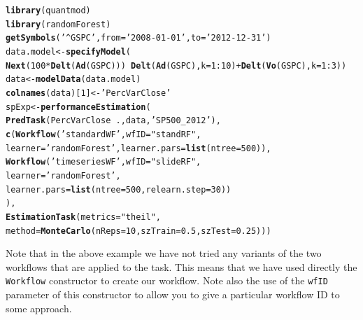 \documentclass[10pt,a4paper]{article}\usepackage[]{graphicx}\usepackage[]{color}
\makeatletter
\newcommand{\hlnum}[1]{\textcolor[rgb]{0.686,0.059,0.569}{#1}}%
\newcommand{\hlstr}[1]{\textcolor[rgb]{0.192,0.494,0.8}{#1}}%
\newcommand{\hlopt}[1]{\textcolor[rgb]{0,0,0}{#1}}%
\newcommand{\hlstd}[1]{\textcolor[rgb]{0.345,0.345,0.345}{#1}}%
\newcommand{\hlkwb}[1]{\textcolor[rgb]{0.69,0.353,0.396}{#1}}%
\newcommand{\hlkwc}[1]{\textcolor[rgb]{0.333,0.667,0.333}{#1}}%
\newcommand{\hlkwd}[1]{\textcolor[rgb]{0.737,0.353,0.396}{\textbf{#1}}}%
\newenvironment{kframe}{%
 \def\at@end@of@kframe{}%
 \ifinner\ifhmode%
  \def\at@end@of@kframe{\end{minipage}}%
  \begin{minipage}{\columnwidth}%
 \fi\fi%
 \def\FrameCommand##1{\hskip\@totalleftmargin \hskip-\fboxsep
 \colorbox{shadecolor}{##1}\hskip-\fboxsep
     \hskip-\linewidth \hskip-\@totalleftmargin \hskip\columnwidth}%
 \MakeFramed {\advance\hsize-\width
   \@totalleftmargin\z@ \linewidth\hsize
   \@setminipage}}%
 {\par\unskip\endMakeFramed%
 \at@end@of@kframe}
\newenvironment{knitrout}{}{} %
\makeatother
\begin{document}
\begin{knitrout}\small
{}\color{fgcolor}\begin{kframe}
\begin{alltt}
\hlkwd{library}\hlstd{(quantmod)}
\hlkwd{library}\hlstd{(randomForest)}
\hlkwd{getSymbols}\hlstd{(}\hlstr{'^GSPC'}\hlstd{,}\hlkwc{from}\hlstd{=}\hlstr{'2008-01-01'}\hlstd{,}\hlkwc{to}\hlstd{=}\hlstr{'2012-12-31'}\hlstd{)}
\hlstd{data.model} \hlkwb{<-} \hlkwd{specifyModel}\hlstd{(}
  \hlkwd{Next}\hlstd{(}\hlnum{100}\hlopt{*}\hlkwd{Delt}\hlstd{(}\hlkwd{Ad}\hlstd{(GSPC)))} \hlopt{~} \hlkwd{Delt}\hlstd{(}\hlkwd{Ad}\hlstd{(GSPC),}\hlkwc{k}\hlstd{=}\hlnum{1}\hlopt{:}\hlnum{10}\hlstd{)}\hlopt{+}\hlkwd{Delt}\hlstd{(}\hlkwd{Vo}\hlstd{(GSPC),}\hlkwc{k}\hlstd{=}\hlnum{1}\hlopt{:}\hlnum{3}\hlstd{))}
\hlstd{data} \hlkwb{<-} \hlkwd{modelData}\hlstd{(data.model)}
\hlkwd{colnames}\hlstd{(data)[}\hlnum{1}\hlstd{]} \hlkwb{<-} \hlstr{'PercVarClose'}
\hlstd{spExp} \hlkwb{<-} \hlkwd{performanceEstimation}\hlstd{(}
  \hlkwd{PredTask}\hlstd{(PercVarClose} \hlopt{~} \hlstd{.,data,}\hlstr{'SP500_2012'}\hlstd{),}
  \hlkwd{c}\hlstd{(}\hlkwd{Workflow}\hlstd{(}\hlstr{'standardWF'}\hlstd{,}\hlkwc{wfID}\hlstd{=}\hlstr{"standRF"}\hlstd{,}
             \hlkwc{learner}\hlstd{=}\hlstr{'randomForest'}\hlstd{,}\hlkwc{learner.pars}\hlstd{=}\hlkwd{list}\hlstd{(}\hlkwc{ntree}\hlstd{=}\hlnum{500}\hlstd{)),}
    \hlkwd{Workflow}\hlstd{(}\hlstr{'timeseriesWF'}\hlstd{,}\hlkwc{wfID}\hlstd{=}\hlstr{"slideRF"}\hlstd{,}
             \hlkwc{learner}\hlstd{=}\hlstr{'randomForest'}\hlstd{,}
             \hlkwc{learner.pars}\hlstd{=}\hlkwd{list}\hlstd{(}\hlkwc{ntree}\hlstd{=}\hlnum{500}\hlstd{,}\hlkwc{relearn.step}\hlstd{=}\hlnum{30}\hlstd{))}
   \hlstd{),}
  \hlkwd{EstimationTask}\hlstd{(}\hlkwc{metrics}\hlstd{=}\hlstr{"theil"}\hlstd{,}
                 \hlkwc{method}\hlstd{=}\hlkwd{MonteCarlo}\hlstd{(}\hlkwc{nReps}\hlstd{=}\hlnum{10}\hlstd{,}\hlkwc{szTrain}\hlstd{=}\hlnum{0.5}\hlstd{,}\hlkwc{szTest}\hlstd{=}\hlnum{0.25}\hlstd{)))}
\end{alltt}
\end{kframe}
\end{knitrout}

Note that in the above example we have not tried any variants of the two workflows that are applied to the task. This means that we have used directly the \texttt{Workflow} constructor to create our workflow. Note also the use of the \texttt{wfID} parameter of this constructor to allow you to give a particular workflow ID to some approach.
\end{document}
